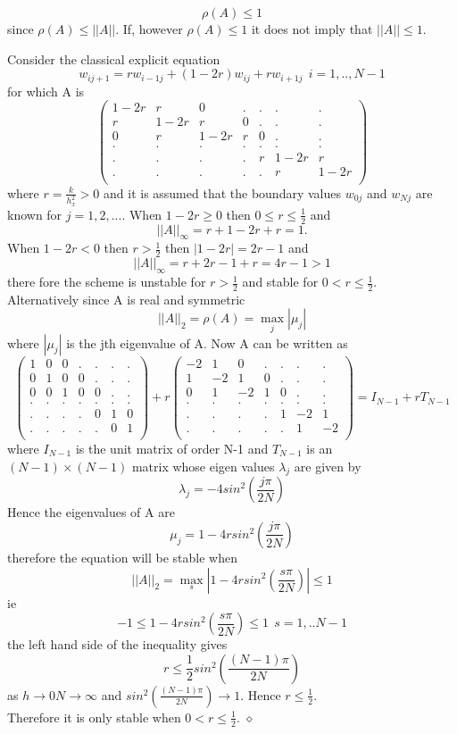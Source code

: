 \[\rho(A)\leq 1\] since $\rho(A)\leq ||A||$. If, however $\rho(A)\leq 1$ it does not imply that $||A|| \leq 1$.
\begin{example} 
Consider the classical explicit equation
\[ w_{ij+1}=rw_{i-1j}+(1-2r)w_{ij}+rw_{i+1j} \ \ i=1,..,N-1 \]
for which A is
\[
\left(\begin{array}{ccccccc}
1-2r&r&0&.&.&.&.\\
r&1-2r&r&0&.&.&.\\
0&r&1-2r&r&0&.&.\\
.&.&.&.&.&.&.\\
.&.&.&.&r&1-2r&r\\
.&.&.&.&.&r&1-2r\\
\end{array}\right)
\]
where $r=\frac{k}{h_x^2}>0$ and it is assumed that the boundary values $w_{0j}$ and $w_{Nj}$ are known for $j=1,2,...$.  When $1-2r \geq 0$ then $0\leq r \leq \frac{1}{2}$ and
\[ ||A||_{\infty}=r+1-2r+r=1. \]
When $1-2r <0$ then $r >\frac{1}{2}$ then $|1-2r|=2r-1$
and
\[||A||_{\infty}=r+2r-1+r=4r-1>1\]
there fore the scheme is unstable for $r>\frac{1}{2}$ and stable for 
$0<r \leq \frac{1}{2}$.\\
Alternatively since A is real and symmetric 
\[||A||_2=\rho(A)=\max_j|\mu_j| \]
where $|\mu_j|$ is the jth eigenvalue of A. Now A can be written as
\[ \left(\begin{array}{ccccccc}
1&0&0&.&.&.&.\\
0&1&0&0&.&.&.\\
0&0&1&0&0&.&.\\
.&.&.&.&.&.&.\\
.&.&.&.&0&1&0\\
.&.&.&.&.&0&1\\
\end{array}\right)
+r\left(\begin{array}{ccccccc}
-2&1&0&.&.&.&.\\
1&-2&1&0&.&.&.\\
0&1&-2&1&0&.&.\\
.&.&.&.&.&.&.\\
.&.&.&.&1&-2&1\\
.&.&.&.&.&1&-2\\
\end{array}\right)=I_{N-1}+rT_{N-1}\]
where $I_{N-1}$ is the unit matrix of order N-1 and $T_{N-1}$ is an $(N-1)\times(N-1)$
matrix whose eigen values $\lambda_j$ are given by
\[ \lambda_j = -4 sin^2(\frac{j\pi}{2N}) \]
Hence the eigenvalues of A are
\[\mu_j=1-4rsin^2(\frac{j\pi}{2N}) \]
therefore the equation will be stable when
\[||A||_2=\max_s|1-4rsin^2(\frac{s\pi}{2N})|\leq 1\]
ie
\[ -1 \leq 1-4rsin^2(\frac{s\pi}{2N})\leq 1 \ \ s=1,..N-1\]
the left hand side of the inequality gives
\[ r \leq \frac{1}{2}sin^2(\frac{(N-1)\pi}{2N})\]
as $h \rightarrow 0 N\rightarrow \infty$ and $sin^2(\frac{(N-1)\pi}{2N})\rightarrow 1$. Hence $r\leq \frac{1}{2}$.\\
Therefore it is only stable when $0<r\leq \frac{1}{2}$.
$\diamond$
\end{example} 
